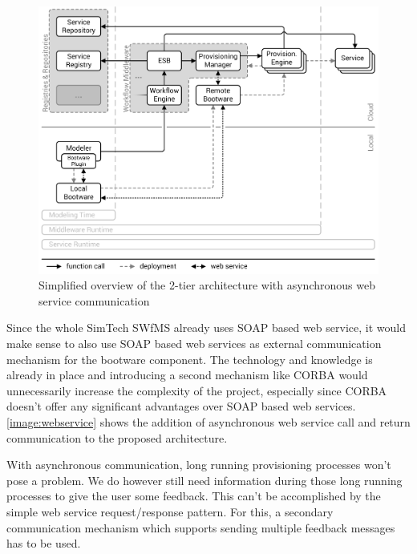 \begin{figure}[!htbp]
	\centering
	\includegraphics[resolution=600]{design/assets/simple_webservice}
	\caption{Simplified overview of the 2-tier architecture with asynchronous web service communication}
	\label{image:webservice}
\end{figure}

Since the whole SimTech SWfMS already uses SOAP based web service, it would make sense to also use SOAP based web services as external communication mechanism for the bootware component.
The technology and knowledge is already in place and introducing a second mechanism like CORBA would unnecessarily increase the complexity of the project, especially since CORBA doesn't offer any significant advantages over SOAP based web services.
\autoref{image:webservice} shows the addition of asynchronous web service call and return communication to the proposed architecture.

With asynchronous communication, long running provisioning processes won't pose a problem.
We do however still need information during those long running processes to give the user some feedback.
This can't be accomplished by the simple web service request/response pattern.
For this, a secondary communication mechanism which supports sending multiple feedback messages has to be used.

